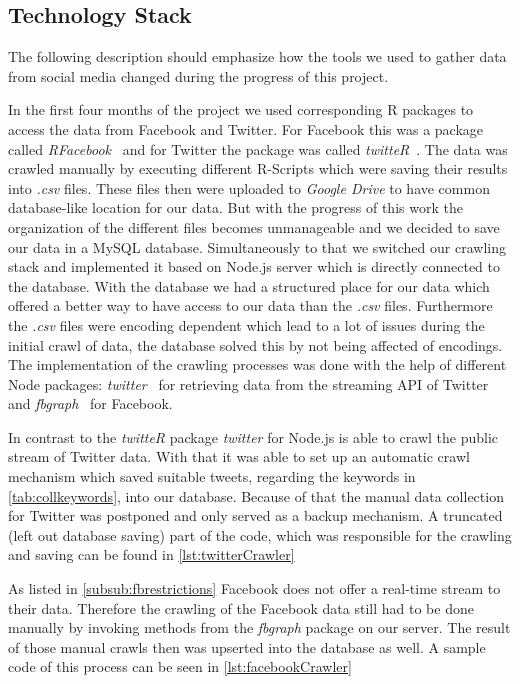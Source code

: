 \documentclass[11pt,titlepage,oneside,openany]{book}
\begin{document}
\subsection{Technology Stack}
\label{sec:datatechstack}

The following description should emphasize how the tools we used to gather data from social media changed during the progress of this project.

In the first four months of the project we used corresponding R packages to access the data from Facebook and Twitter. For Facebook this was a package called \textit{RFacebook}~\cite{Barbera2017-05-25} and for Twitter the package was called \textit{twitteR}~\cite{Grentry2015-07-29}. The data was crawled manually by executing different R-Scripts which were saving their results into \textit{.csv} files. These files then were uploaded to \textit{Google Drive} to have common database-like location for our data. But with the progress of this work the organization of the different files becomes unmanageable and we decided to save our data in a MySQL database.
Simultaneously to that we switched our crawling stack and implemented it based on Node.js server which is directly connected to the database. With the database we had a structured place for our data which offered a better way to have access to our data than the \textit{.csv} files. Furthermore the \textit{.csv} files were encoding dependent which lead to a lot of issues during the initial crawl of data, the database solved this by not being affected of encodings.
The implementation of the crawling processes was done with the help of different Node packages: \textit{twitter}~\cite{Morris2017-01-13} for retrieving data from the streaming API of Twitter and \textit{fbgraph}~\cite{Oliveira2017-01-19} for Facebook. 

In contrast to the \textit{twitteR} package \textit{twitter} for Node.js is able to crawl the public stream of Twitter data. With that it was able to set up an automatic crawl mechanism which saved suitable tweets, regarding the keywords in \autoref{tab:collkeywords}, into our database. Because of that the manual data collection for Twitter was postponed and only served as a backup mechanism. A truncated (left out database saving) part of the code, which was responsible for the crawling and saving can be found in \autoref{lst:twitterCrawler} 

As listed in \autoref{subsub:fbrestrictions} Facebook does not offer a real-time stream to their data. Therefore the crawling of the Facebook data still had to be done manually by invoking methods from the \textit{fbgraph} package on our server. The result of those manual crawls then was upserted into the database as well. A sample code of this process can be seen in \autoref{lst:facebookCrawler}
\end{document}

